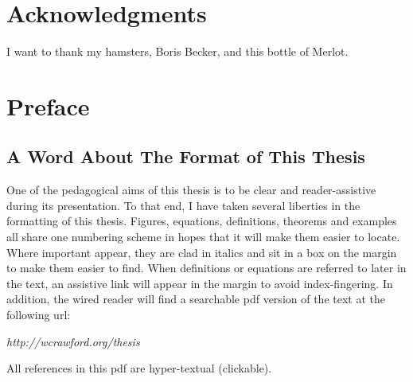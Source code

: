 \chapter*{Acknowledgments}
I want to thank my hamsters, Boris Becker, and this bottle of Merlot.

\chapter*{Preface}
\section*{A Word About The Format of This Thesis}
One of the pedagogical aims of this thesis is to be clear and reader-assistive during its presentation.  To that end, I have taken several liberties in the formatting of this thesis.  Figures, equations, definitions, theorems and examples all share one numbering scheme in hopes that it will make them easier to locate. Where important  appear, they are clad in italics and sit in a box on the margin to make them easier to find.  When  definitions or equations are referred to later in the text, an assistive link will appear in the margin to avoid index-fingering.  In addition, the wired reader will find a searchable pdf version of the text at the following url:
\begin{center}
	\emph{http://wcrawford.org/thesis}
\end{center}
All references in this pdf are hyper-textual (clickable).